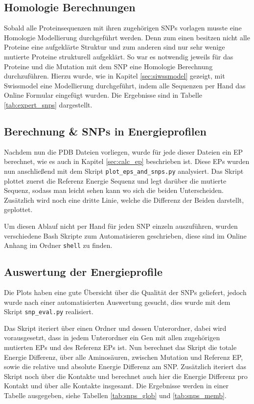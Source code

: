 \subsection{Homologie Berechnungen}

Sobald alle Proteinsequenzen mit ihren zugehörigen \ac{SNP}s vorlagen musste eine Homologie Modellierung durchgeführt werden. Denn zum einen besitzen nicht alle Proteine eine aufgeklärte Struktur und zum anderen sind nur sehr wenige mutierte Proteine strukturell aufgeklärt. So war es notwendig jeweils für das Proteine und die Mutation mit dem \ac{SNP} eine Homologie Berechnung durchzuführen. Hierzu wurde, wie in Kapitel \ref{sec:siwssmodel} gezeigt, mit Swissmodel eine Modellierung durchgeführt, indem alle Sequenzen per Hand das Online Formular eingefügt wurden. Die Ergebnisse sind in Tabelle \ref{tab:expert_snps} dargestellt.


\subsection{Berechnung \& SNPs in Energieprofilen}
\label{sec:plot_eps}

Nachdem nun die \ac{PDB} Dateien vorliegen, wurde für jede dieser Dateien ein \ac{EP} berechnet, wie es auch in Kapitel \ref{sec:calc_ep} beschrieben ist. Diese \ac{EP}s wurden nun anschließend mit dem Skript \texttt{plot\_eps\_and\_snps.py} analysiert. Das Skript plottet zuerst die Referenz Energie Sequenz und legt darüber die mutierte Sequenz, sodass man leicht sehen kann wo sich die beiden Unterscheiden. Zusätzlich wird noch eine dritte Linie, welche die Differenz der Beiden darstellt, geplottet.

Um diesen Ablauf nicht per Hand für jeden \ac{SNP} einzeln auszuführen, wurden verschiedene Bash Skripte zum Automatisieren geschrieben, diese sind im Online Anhang im Ordner \texttt{shell} zu finden.


\subsection{Auswertung der Energieprofile}
\label{sec:auswertung_eps}

Die Plots haben eine gute Übersicht über die Qualität der \ac{SNP}s geliefert, jedoch wurde nach einer automatisierten Auswertung gesucht, dies wurde mit dem Skript \texttt{snp\_eval.py} realisiert.

Das Skript iteriert über einen Ordner und dessen Unterordner, dabei wird vorausgesetzt, dass in jedem Unterordner ein Gen mit allen zugehörigen mutierten \ac{EP}s und des Referenz \ac{EP}s ist. Nun berechnet das Skript die totale Energie Differenz, über alle Aminosäuren, zwischen Mutation und Referenz \ac{EP}, sowie die relative und absolute Energie Differenz am \ac{SNP}. Zusätzlich iteriert das Skript noch über die Kontakte und berechnet auch hier die Energie Differenz pro Kontakt und über alle Kontakte insgesamt. Die Ergebnisse werden in einer Tabelle ausgegeben, siehe Tabellen \ref{tab:snps_glob} und \ref{tab:snps_memb}.


